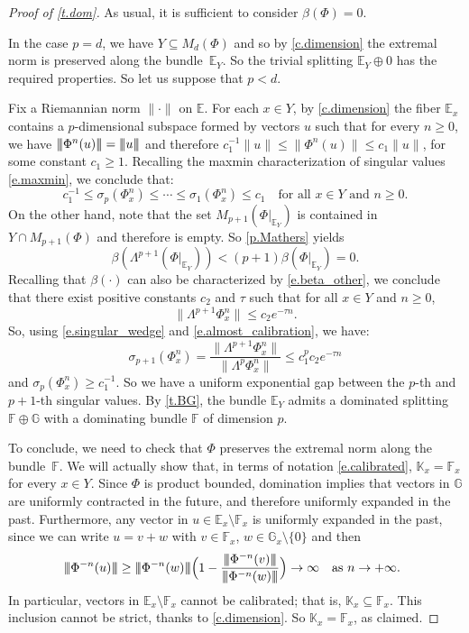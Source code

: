 \documentclass[10pt]{amsart}
\theoremstyle{plain}
\theoremstyle{definition}
\newcommand{\tribar}[1]{\mathopen{| {\kern -1.5pt} | {\kern -1.5pt} |} {#1}
\mathclose{| {\kern -1.5pt} | {\kern -1.5pt} |}}
\newcommand{\EE}{\mathbb{E}}
\newcommand{\FF}{\mathbb{F}}
\newcommand{\GG}{\mathbb{G}}
\newcommand{\KK}{\mathbb{K}}
\newcommand{\WEDGE}{\mathsf{\Lambda}}
\begin{document}
\begin{proof}[Proof of \cref{t.dom}]
As usual, it is sufficient to consider $\beta(\Phi) = 0$.

In the case $p=d$, we have $Y \subseteq M_d(\Phi)$ and so by \cref{c.dimension} the extremal norm is preserved along the bundle~$\EE_Y$. So the trivial splitting $\EE_Y \oplus 0$ has the required properties.
So let us suppose that $p<d$.

Fix a Riemannian norm $\| \mathord{\cdot} \|$ on $\EE$.
For each $x \in Y$, by \cref{c.dimension} the fiber $\EE_x$ contains a $p$-dimensional subspace formed by vectors $u$ such that for every $n \ge 0$, we have $\tribar{\Phi^n(u)} = \tribar{u}$ and therefore
$c_1^{-1} \|u\| \le \| \Phi^n(u) \| \le c_1 \|u\|$, for some constant $c_1 \ge 1$.
Recalling the maxmin characterization of singular values \eqref{e.maxmin}, we conclude that:
\begin{equation}\label{e.almost_calibration}
c_1^{-1} \le \sigma_p(\Phi^n_x) \le \cdots \le \sigma_1(\Phi^n_x) \le c_1 \quad \text{for all $x \in Y$ and $n \ge 0$.}
\end{equation}
On the other hand, note that the set $M_{p+1} (\Phi|_{\EE_Y})$ is contained in $Y \cap M_{p+1}(\Phi)$ and therefore is empty.
So \cref{p.Mathers} yields
\[
\beta \left( \WEDGE^{p+1} (\Phi|_{\EE_Y}) \right) < (p+1) \beta(\Phi|_{\EE_Y}) = 0.
\]
Recalling that $\beta(\mathord{\cdot})$ can also be characterized by \eqref{e.beta_other}, we conclude that there exist positive constants $c_2$ and $\tau$ such that for all $x \in Y$ and $n \ge 0$,
\[
\| \WEDGE^{p+1} \Phi^n_x \| \le c_2 e^{-\tau n}.
\]
So, using \eqref{e.singular_wedge} and \eqref{e.almost_calibration}, we have:
\[
\sigma_{p+1} (\Phi^n_x) = \frac{\| \WEDGE^{p+1} \Phi^n_x \|}{\| \WEDGE^p \Phi^n_x \|} \le c_1^p c_2 e^{-\tau n}
\]
and $\sigma_p (\Phi^n_x) \ge c_1^{-1}$.
So we have a uniform exponential gap between the $p$-th and $p+1$-th singular values.
By \cref{t.BG}, the bundle $\EE_Y$ admits a dominated splitting $\FF \oplus \GG$ with a dominating bundle $\FF$ of dimension $p$.

To conclude, we need to check that $\Phi$ preserves the extremal norm along the bundle~$\FF$.
We will actually show that, in terms of notation \eqref{e.calibrated}, $\KK_x = \FF_x$ for every $x \in Y$.
Since $\Phi$ is product bounded, domination implies that vectors in $\GG$ are uniformly contracted in the future, and therefore uniformly expanded in the past.
Furthermore, any vector in $u \in \EE_x \setminus \FF_x$ is uniformly expanded in the past, since we can write $u = v + w$ with $v \in \FF_x$, $w \in \GG_x \setminus \{0\}$ and then
\[
\tribar{\Phi^{-n}(u)} \ge \tribar{\Phi^{-n}(w)} \Bigl( 1 - \frac{\tribar{\Phi^{-n}(v)}}{\tribar{\Phi^{-n}(w)}} \Bigr) \to \infty \quad \text{as $n \to +\infty$. }
\]
In particular, vectors in $\EE_x \setminus \FF_x$ cannot be calibrated; that is, $\KK_x \subseteq \FF_x$. This inclusion cannot be strict, thanks to \cref{c.dimension}.
So $\KK_x = \FF_x$, as claimed.
\end{proof}
\end{document}
